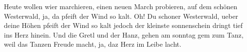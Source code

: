 \beginverse*
Heute wollen wier marchieren,
einen neuen March probieren,
auf dem schönen Westerwald,
ja, da pfeift der Wind so kalt.
\endverse
\beginverse*
Oh! Du schoner Westerwald,
ueber deine Höhen pfeift der Wind so kalt
jedoch der kleinste sonnenschein
dringt tief ins Herz hinein.
\endverse
\beginverse*
Und die Gretl und der Hanz,
gehen am sonntag gem zum Tanz,
weil das Tanzen Freude macht,
ja, daz Herz im Leibe lacht.
\endverse
\endsong